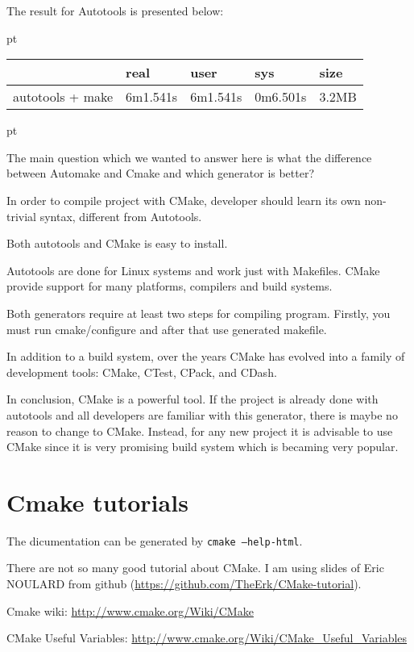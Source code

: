 \documentclass[a4paper,10pt]{article}
\begin{document}
The result for Autotools is presented below:

 pt

\begin{tabular}{|l|l|l|l|l|}
	\hline
	& real & user & sys & size\\
	\hline
	autotools + make & 6m1.541s & 6m1.541s & 0m6.501s & 3.2MB\\
	\hline
\end{tabular}

 pt

The main question which we wanted to answer here is what the difference between Automake and Cmake and which generator is better?


In order to compile project with CMake, developer should learn its own non-trivial syntax, different from Autotools.

Both autotools and CMake is easy to install.

Autotools are done for Linux systems and work just with Makefiles. CMake provide support for many platforms, compilers and build systems.

Both generators require at least two steps for compiling program. Firstly, you must run cmake/configure and after that use generated makefile.


In addition to a build system, over the years CMake has evolved into a family of development tools: CMake, CTest, CPack, and CDash.


In conclusion, CMake is a powerful tool. If the project is already done with autotools and all developers are familiar with this generator, there is maybe no reason to change to CMake. Instead, for any new project it is advisable to use CMake since it is very promising build system which is becaming very popular. 



\section{Cmake tutorials}

The dicumentation can be generated by \texttt{cmake --help-html}.

There are not so many good tutorial about CMake. I am using slides of Eric NOULARD from github (\url{https://github.com/TheErk/CMake-tutorial}).

Cmake wiki: \url{http://www.cmake.org/Wiki/CMake}

CMake Useful Variables: \url{http://www.cmake.org/Wiki/CMake_Useful_Variables}
\end{document}
